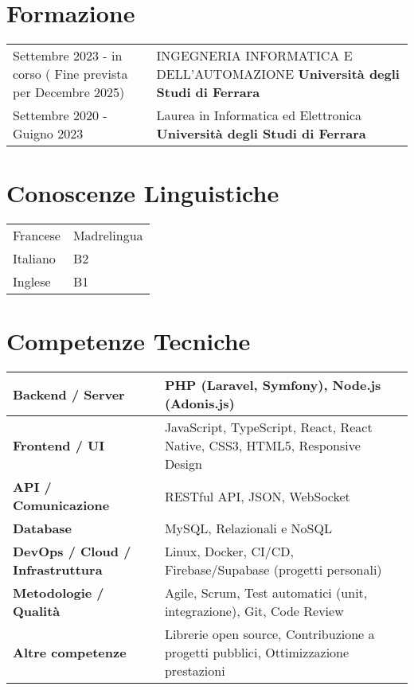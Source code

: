 \documentclass[a4paper,12pt]{article}
\begin{document}
\section{Formazione}
\begin{tabularx}{\linewidth}{@{}l X@{}}
Settembre 2023 - in corso ( Fine prevista per Decembre 2025) & INGEGNERIA INFORMATICA E DELL’AUTOMAZIONE \textbf{Università degli Studi di Ferrara} \\
Settembre 2020 - Guigno 2023 & Laurea in Informatica ed Elettronica  \textbf{Università degli Studi di Ferrara} \\
\end{tabularx}

\section{Conoscenze Linguistiche}
\begin{tabularx}{\linewidth}{@{}l X@{}}
Francese & Madrelingua \\
Italiano & B2 \\
Inglese & B1 \\
\end{tabularx}


\section{Competenze Tecniche}

\begin{tabularx}{\linewidth}{|>{\raggedright\arraybackslash}p{4cm}|X|}
\hline
\textbf{Backend / Server} & PHP (Laravel, Symfony), Node.js (Adonis.js) \\
\hline
\textbf{Frontend / UI} & JavaScript, TypeScript, React, React Native, CSS3, HTML5, Responsive Design \\
\hline
\textbf{API / Comunicazione} & RESTful API, JSON, WebSocket \\
\hline
\textbf{Database} & MySQL, Relazionali e NoSQL \\
\hline
\textbf{DevOps / Cloud / Infrastruttura} & Linux, Docker, CI/CD, Firebase/Supabase (progetti personali)  \\
\hline
\textbf{Metodologie / Qualità} & Agile, Scrum, Test automatici (unit, integrazione), Git, Code Review \\
\hline
\textbf{Altre competenze} & Librerie open source, Contribuzione a progetti pubblici, Ottimizzazione prestazioni \\
\hline
\end{tabularx}
\end{document}
